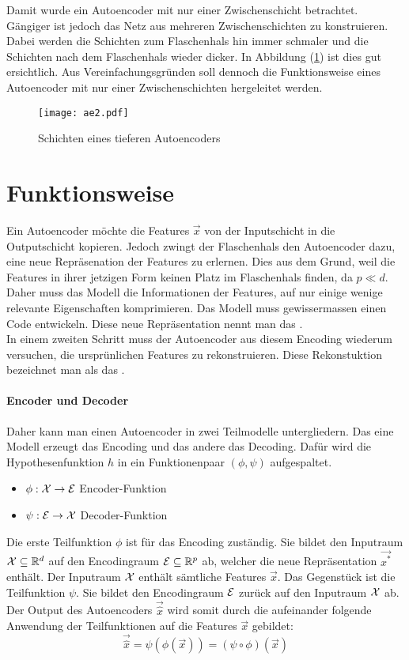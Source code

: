 \para{}
Damit wurde ein Autoencoder mit nur einer Zwischenschicht betrachtet.
Gängiger ist jedoch das Netz aus mehreren Zwischenschichten zu konstruieren. Dabei
werden die Schichten zum Flaschenhals hin immer schmaler und die Schichten nach
dem Flaschenhals wieder dicker. In Abbildung (\ref{fig:big_autoencoder})
ist dies gut ersichtlich.
Aus Vereinfachungsgründen soll dennoch die Funktionsweise eines Autoencoder mit
nur einer Zwischenschichten hergeleitet werden.
\para{}
\begin{figure}[h!]
  \centering
  \texttt{[image: ae2.pdf]}
  \caption{Schichten eines tieferen Autoencoders}
  \label{fig:big_autoencoder}
\end{figure}

\section{Funktionsweise}
Ein Autoencoder möchte die Features $\vec{x}$ von der Inputschicht in die
Outputschicht kopieren. Jedoch zwingt der Flaschenhals den Autoencoder dazu, eine
neue Repräsenation der Features zu erlernen. Dies aus dem Grund, weil die
Features in ihrer jetzigen Form keinen Platz im Flaschenhals finden, da $p \ll d$.
Daher muss das Modell die Informationen der Features,
auf nur einige wenige relevante Eigenschaften komprimieren.
Das Modell muss gewissermassen einen Code entwickeln.
Diese neue Repräsentation nennt man das . \\
In einem zweiten Schritt muss der Autoencoder aus diesem Encoding wiederum
versuchen, die ursprünlichen Features zu rekonstruieren. Diese Rekonstuktion
bezeichnet man als das .

\paragraph{Encoder und Decoder}
Daher kann man einen Autoencoder in zwei Teilmodelle untergliedern. Das
eine Modell erzeugt das Encoding und das andere das Decoding. Dafür wird
die Hypothesenfunktion $h$ in ein Funktionenpaar $(\phi,\psi)$ aufgespaltet.
\begin{itemize}
\item{$\phi: \mathcal{X} \to \mathcal{E}$ Encoder-Funktion}
\item{$\psi: \mathcal{E} \to \mathcal{X}$ Decoder-Funktion}
\end{itemize}
Die erste Teilfunktion $\phi$ ist für das Encoding zuständig. Sie
bildet den Inputraum $\mathcal{X} \subseteq \mathbb{R}^d$ auf
den Encodingraum $\mathcal{E} \subseteq \mathbb{R}^p$ ab, welcher die neue
Repräsentation $\vec{x^*}$ enthält. Der Inputraum $\mathcal{X}$ enthält
sämtliche Features $\vec{x}$.
\para{}
Das Gegenstück ist die Teilfunktion $\psi$. Sie bildet den Encodingraum
$\mathcal{E}$ zurück auf den Inputraum $\mathcal{X}$ ab.
\para{}
Der Output des Autoencoders $\vec{\hat{x}}$ wird somit durch die aufeinander
folgende Anwendung der Teilfunktionen auf die Features $\vec{x}$ gebildet:
\begin{equation}
  \vec{\hat{x}} = \psi(\phi(\vec{x})) = (\psi \circ \phi)(\vec{x})
\end{equation}

